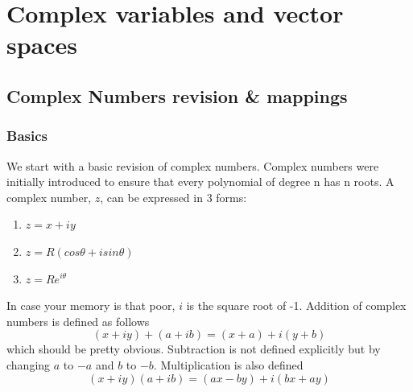 \chapter{Complex variables and vector spaces}
\minitoc
\pagebreak
\section{Complex Numbers revision \& mappings}
\subsection{Basics}
We start with a basic revision of complex numbers.
 Complex numbers were initially introduced to ensure that every polynomial of degree n has n roots. 
 A complex number, $z$, can be expressed in 3 forms:
\begin{enumerate}
	\item $z=x+iy$
	\item $z=R(cos\theta+isin\theta)$
	\item $z=Re^{i\theta}$
\end{enumerate}
In case your memory is that poor, $i$ is the square root of -1.
 Addition of complex numbers is defined as follows $$(x+iy) + (a+ib) = (x+a) + i(y+b) $$
which should be pretty obvious.
 Subtraction is not defined explicitly but by changing $a$ to $-a$ and $b$ to $-b$.
  Multiplication is also defined $$(x+iy)(a+ib) = (ax-by)+i(bx+ay)$$
